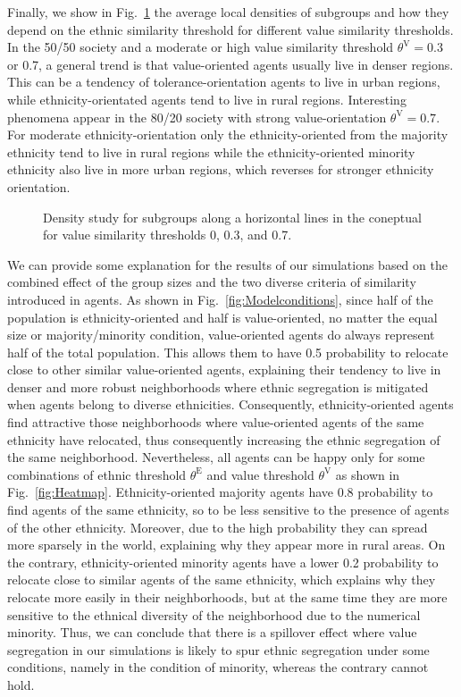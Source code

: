 \documentclass{ws-acs}
\begin{document}
Finally, we show in Fig.~\ref{fig:Densities} the average local densities of subgroups and how they depend on the ethnic similarity threshold for different value similarity thresholds. In the 50/50 society and a moderate or high value similarity threshold $\theta^\text{V}=0.3$ or 0.7, a general trend is that value-oriented agents usually live in denser regions. This can be a tendency of tolerance-orientation agents to live in urban regions, while ethnicity-orientated agents tend to live in rural regions. Interesting phenomena appear in the 80/20 society with strong value-orientation $\theta^\text{V}=0.7$. For moderate ethnicity-orientation only the ethnicity-oriented from the majority ethnicity tend to live in rural regions while the ethnicity-oriented minority ethnicity also live in more urban regions, which reverses for stronger ethnicity orientation. 

\begin{figure}[th]
\centerline{}
\vspace*{8pt}
\caption{Density study for subgroups along a horizontal lines in the coneptual for value similarity thresholds 0, 0.3, and 0.7.}
\label{fig:Densities}
\end{figure}

We can provide some explanation for the results of our simulations based on the combined effect of the group sizes and the two diverse criteria of similarity introduced in agents. As shown in Fig.~\ref{fig:Modelconditions}, since half of the population is ethnicity-oriented and half is value-oriented, no matter the equal size or majority/minority condition, value-oriented agents do always represent half of the total population. This allows them to have 0.5 probability to relocate close to other similar value-oriented agents, explaining their tendency to live in denser and more robust neighborhoods where ethnic segregation is mitigated when agents belong to diverse ethnicities. Consequently, ethnicity-oriented agents find attractive those neighborhoods where value-oriented agents of the same ethnicity have relocated, thus consequently increasing the ethnic segregation of the same neighborhood. Nevertheless, all agents can be happy only for some combinations of ethnic threshold $\theta^\text{E}$ and value threshold $\theta^\text{V}$ as shown in Fig.~\ref{fig:Heatmap}. Ethnicity-oriented majority agents have 0.8 probability to find agents of the same ethnicity, so to be less sensitive to the presence of agents of the other ethnicity. Moreover, due to the high probability they can spread more sparsely in the world, explaining why they appear more in rural areas. On the contrary, ethnicity-oriented minority agents have a lower 0.2 probability to relocate close to similar agents of the same ethnicity, which explains why they relocate more easily in their neighborhoods, but at the same time they are more sensitive to the ethnical diversity of the neighborhood due to the numerical minority. Thus, we can conclude that there is a spillover effect where value segregation in our simulations is likely to spur ethnic segregation under some conditions, namely in the condition of minority, whereas the contrary cannot hold.
\end{document}
